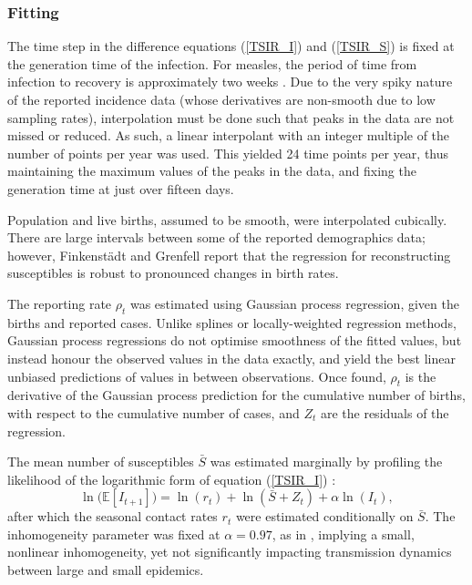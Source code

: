 \documentclass[10pt]{article}
\begin{document}
\subsubsection*{Fitting}

The time step in the difference equations (\ref{TSIR_I}) and (\ref{TSIR_S}) is fixed at the generation time of the infection. For measles, the period of time from infection to recovery is approximately two weeks \cite{Anderson1991}. Due to the very spiky nature of the reported incidence data (whose derivatives are non-smooth due to low sampling rates), interpolation must be done such that peaks in the data are not missed or reduced. As such, a linear interpolant with an integer multiple of the number of points per year was used. This yielded 24 time points per year, thus maintaining the maximum values of the peaks in the data, and fixing the generation time at just over fifteen days.

Population and live births, assumed to be smooth, were interpolated cubically. There are large intervals between some of the reported demographics data; however, Finkenst\"{a}dt and Grenfell \cite{Finkenstadt2000} report that the regression for reconstructing susceptibles is robust to pronounced changes in birth rates.

The reporting rate $\rho_t$ was estimated using Gaussian process regression, given the births and reported cases. Unlike splines or locally-weighted regression methods, Gaussian process regressions do not optimise smoothness of the fitted values, but instead honour the observed values in the data exactly, and yield the best linear unbiased predictions of values in between observations. Once found, $\rho_t$ is the derivative of the Gaussian process prediction for the cumulative number of births, with respect to the cumulative number of cases, and $Z_t$ are the residuals of the regression.

The mean number of susceptibles $\bar{S}$ was estimated marginally by profiling the likelihood of the logarithmic form of equation (\ref{TSIR_I}) :
\begin{equation}
\ln\big(\mathbb{E}\left[I_{t+1}\right]\big) = \ln(r_t) + \ln\left(\bar{S} + Z_t\right) + \alpha \ln\left(I_t\right),
\end{equation}
after which the seasonal contact rates $r_t$ were estimated conditionally on $\bar{S}$. The inhomogeneity parameter was fixed at $\alpha = 0.97$, as in \cite{Metcalf2010}, implying a small, nonlinear inhomogeneity, yet not significantly impacting transmission dynamics between large and small epidemics.
\end{document}
